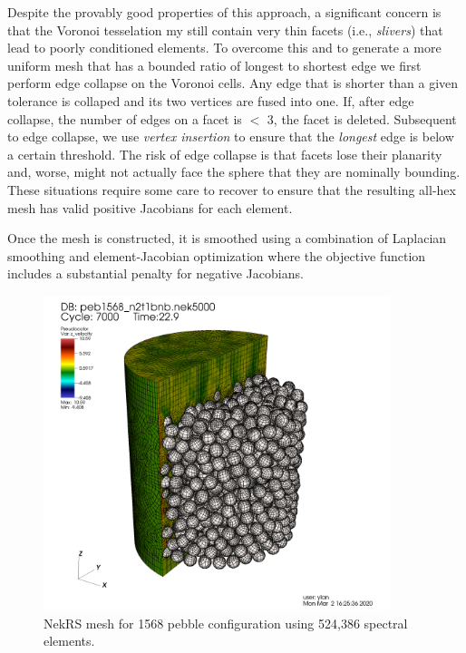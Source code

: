 Despite the provably good properties of this approach, a significant concern is
that the Voronoi tesselation my still contain very thin facets (i.e., {\em
slivers}) that lead to poorly conditioned elements.  To overcome this and to
generate a more uniform mesh that has a bounded ratio of longest to shortest
edge we first perform edge collapse on the Voronoi cells.  Any edge that is
shorter than a given tolerance is collaped and its two vertices are fused into
one.  If, after edge collapse, the number of edges on a facet is $<$ 3, the
facet is deleted.   Subsequent to edge collapse, we use {\em vertex insertion}
to ensure that the {\em longest} edge is below a certain threshold.
The risk of edge collapse is that facets lose their planarity and, worse,
might not actually face the sphere that they are nominally bounding.
These situations require some care to recover to ensure that the
resulting all-hex mesh has valid positive Jacobians for each element.

Once the mesh is constructed, it is smoothed using a combination of Laplacian
smoothing and element-Jacobian optimization where the objective function
includes a substantial penalty for negative Jacobians.

\begin{figure}[!h]
\centering
\includegraphics[clip=true,width=0.9\textwidth]{Figures/ndemo_r1}
\caption{NekRS mesh for 1568 pebble configuration using 524,386 spectral elements. }
\label{f:ndemo1}
\end{figure}

